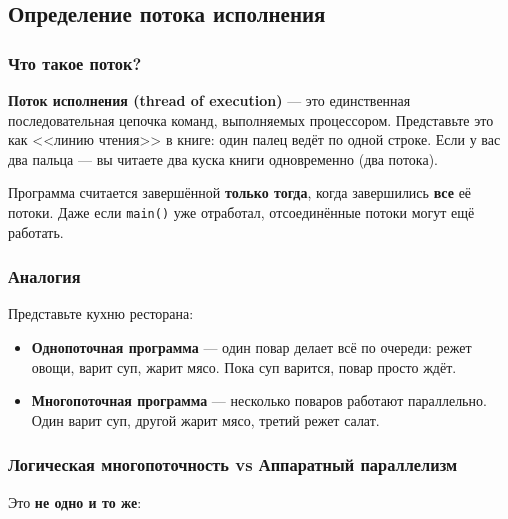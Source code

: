 \documentclass[a4paper,12pt]{article}
\begin{document}
\begin{center}
\end{center}

\medskip

\subsection{Определение потока исполнения}

\subsubsection{Что такое поток?}

\textbf{Поток исполнения (thread of execution)} --- это единственная последовательная
цепочка команд, выполняемых процессором. Представьте это как <<линию чтения>> в книге:
один палец ведёт по одной строке. Если у вас два пальца --- вы читаете два куска книги
одновременно (два потока).

Программа считается завершённой \textbf{только тогда}, когда завершились \textbf{все}
её потоки. Даже если \texttt{main()} уже отработал, отсоединённые потоки могут ещё работать.

\subsubsection{Аналогия}

Представьте кухню ресторана:
\begin{itemize}
    \item \textbf{Однопоточная программа} --- один повар делает всё по очереди:
          режет овощи, варит суп, жарит мясо. Пока суп варится, повар просто ждёт.
    \item \textbf{Многопоточная программа} --- несколько поваров работают параллельно.
          Один варит суп, другой жарит мясо, третий режет салат.
\end{itemize}

\subsubsection{Логическая многопоточность vs Аппаратный параллелизм}

Это \textbf{не одно и то же}:
\end{document}
